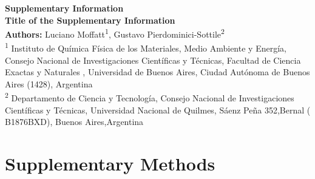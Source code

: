 \documentclass[12pt]{article}
\begin{document}
\begin{center}
\Large\textbf{Supplementary Information}\\[1em]
\normalsize
\textbf{Title of the Supplementary Information}\\[1em]
\textbf{Authors:} Luciano Moffatt\textsuperscript{1}, Gustavo Pierdominici-Sottile\textsuperscript{2}\\[1em]
\small
\textsuperscript{1} Instituto de Qu\'{i}mica F\'{i}sica de los Materiales, Medio Ambiente y Energ\'{i}a, Consejo Nacional de Investigaciones Científicas y T\'{e}cnicas, Facultad de Ciencia Exactas y Naturales , Universidad de Buenos Aires, Ciudad Aut\'{o}noma de Buenos Aires (1428), Argentina\\
\textsuperscript{2} Departamento de Ciencia y Tecnolog\'{i}a, 
Consejo Nacional de Investigaciones Científicas y T\'{e}cnicas,  Universidad Nacional de Quilmes, S\'{a}enz Pe\~{n}a 352,Bernal ( B1876BXD), Buenos Aires,Argentina\\

\end{center}

\section*{Supplementary Methods}
\label{sec:supp-methods}
\lipsum[1] %

\end{document}

